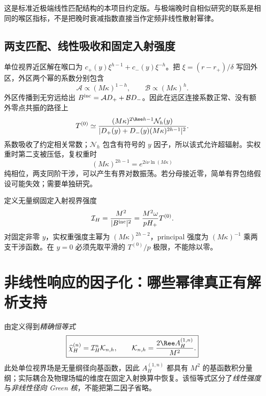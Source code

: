 这是标准近极端线性匹配结构的本项目约定版\cite{BredbergKerrCFT2010}。与极端晚时自相似研究的联系是相同的喉区指标，不是把晚时衰减指数直接当作定频非线性散射幂律。

\subsection{两支匹配、线性吸收和固定入射强度}
单位视界近区解在喉口为 $c_+(y)\xi^{h-1}+c_-(y)\xi^{-h}$。把 $\xi=(r-r_+)/\delta$ 写回外区，外区两个幂的系数分别包含
\begin{equation}
 \mathcal A\propto(M\kappa)^{1-h},\qquad
 \mathcal B\propto(M\kappa)^h.
\end{equation}
外区传播到无穷远给出 $B^{\rm inc}=\mathcal A D_++\mathcal B D_-$。因此在远区连接系数正常、没有额外零点共振的路径上
\begin{equation}
 T^{(0)}\simeq
 \frac{(M\kappa)^{2\Ree h-1}\mathcal N_h(y)}
 {|D_+(y)+D_-(y)(M\kappa)^{2h-1}|^2}.
\label{eq:new-matched-t0}
\end{equation}
系数吸收了约定相关常数；$\mathcal N_h$ 包含有符号的 $y$ 因子，所以该式允许超辐射。实权重时第二支被压低，复权重时
\begin{equation}
 (M\kappa)^{2h-1}=e^{2i\nu\ln(M\kappa)}
\end{equation}
纯相位，两支同阶干涉，可以产生有界对数振荡。若分母接近零，简单有界包络假设可能失效；需要单独研究。

定义无量纲固定入射视界强度
\begin{equation}
 \mathcal I_H=\frac{M^2}{|B^{\rm inc}|^2}
 =\frac{M^2\omega}{pH_+}T^{(0)}.
\end{equation}
对固定非零 $y$，实权重强度主幂为 $(M\kappa)^{2h-2}$，principal 强度为 $(M\kappa)^{-1}$ 乘两支干涉函数。在 $y=0$ 必须先取平滑的 $T^{(0)}/p$ 极限，不能除以零。

\section{非线性响应的因子化：哪些幂律真正有解析支持}
由定义得到\emph{精确恒等式}
\begin{equation}
 \boxed{\widehat\chi_H^{(n)}=\mathcal I_H^n\mathcal K_{n,h},\qquad
 \mathcal K_{n,h}=\frac{2\Ree A_H^{(1,n)}}{M^2}.}
\label{eq:new-factorization}
\end{equation}
此处单位视界场是无量纲径向基函数，因此 $A_H^{(1,n)}$ 都具有 $M^2$ 的基函数积分量纲；实际耦合及物理场幅的维度在固定入射换算中恢复。该恒等式区分了\emph{线性强度}与\emph{非线性径向 Green 核}，不能把第二因子省略。

